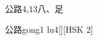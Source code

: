 \begin{entry}{公路}{4,13}{⼋、⾜}
  \begin{phonetics}{公路}{gong1 lu4}[][HSK 2]
  \end{phonetics}
\end{entry}
